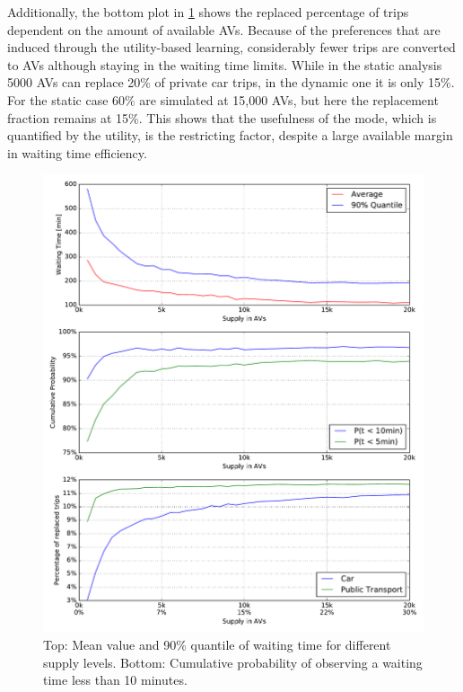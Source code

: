 Additionally, the bottom plot in \cref{fig:waitingsupply} shows the replaced
percentage of trips dependent on the amount of available AVs. Because of the
preferences that are induced through the utility-based learning, considerably
fewer trips are converted to AVs although staying in the waiting time limits.
While in the static analysis 5000 AVs can replace 20\% of private car trips,
in the dynamic one it is only 15\%. For the static case 60\% are simulated
at 15,000 AVs, but here the replacement fraction remains at 15\%. This shows
that the usefulness of the mode, which is quantified by the utility, is the
restricting factor, despite a large available margin in waiting time efficiency.

\begin{figure}
    \centering
    \includegraphics[width=1.0\textwidth]{figures/waitingsupply.pdf}
    \caption{Top: Mean value and 90\% quantile of waiting time for different supply
    levels. Bottom: Cumulative probability of observing a waiting time less than
    10 minutes.}
    \label{fig:waitingsupply}
\end{figure}

